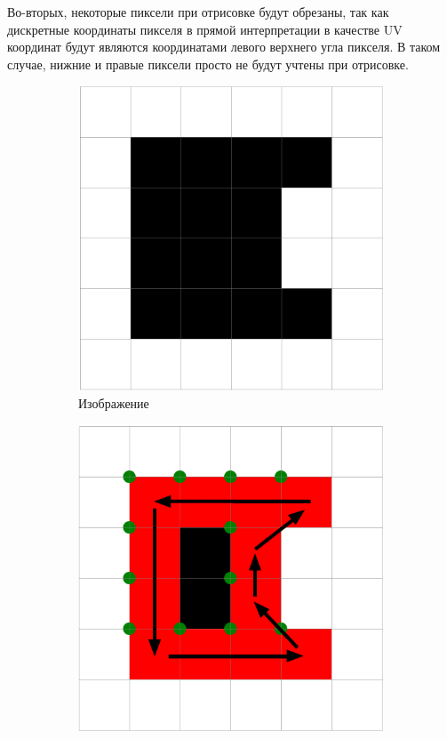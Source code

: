 \documentclass{fefu_thesis/cls/fefu}
\begin{document}
    Во-вторых, некоторые пиксели при отрисовке будут обрезаны, так как дискретные координаты пикселя в прямой интерпретации в качестве UV координат будут являются координатами левого верхнего угла пикселя. В таком случае, нижние и правые пиксели просто не будут учтены при отрисовке.

    \begin{figure}[H]
        \centering
        \begin{subfigure}[t]{.33\linewidth}
            \centering
            \includegraphics[scale=0.3]{images/SuzukiExample2.png}
            \caption{Изображение}
        \end{subfigure}
        \begin{subfigure}[t]{.33\linewidth}
            \centering
            \includegraphics[scale=0.3]{images/SuzukiExample2_uvs.png}

\end{subfigure}
\end{figure}
\end{document}
